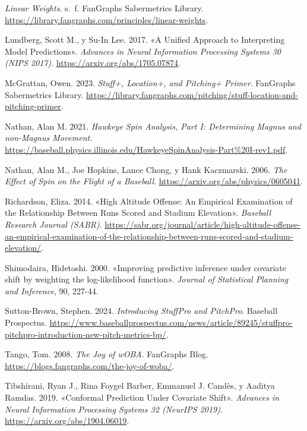 \documentclass[
  english,
  spanish,
  10pt,
  letterpaper,
]{article}
\newlength{\cslhangindent}
\newenvironment{CSLReferences}[2] %
 {\begin{list}{}{%
  \setlength{\itemindent}{0pt}
  \setlength{\leftmargin}{0pt}
  \setlength{\parsep}{0pt}
  \ifodd #1
   \setlength{\leftmargin}{\cslhangindent}
   \setlength{\itemindent}{-1\cslhangindent}
  \fi
  \setlength{\itemsep}{#2\baselineskip}}}
 {\end{list}}
\begin{document}
\begin{CSLReferences}{1}{0}
\emph{Linear Weights}. s.~f. FanGraphs Sabermetrics Library.
\url{https://library.fangraphs.com/principles/linear-weights}.

Lundberg, Scott M., y Su-In Lee. 2017. {«A Unified Approach to
Interpreting Model Predictions»}. \emph{Advances in Neural Information
Processing Systems 30 (NIPS 2017)}.
\url{https://arxiv.org/abs/1705.07874}.

McGrattan, Owen. 2023. \emph{Stuff+, Location+, and Pitching+ Primer}.
FanGraphs Sabermetrics Library.
\url{https://library.fangraphs.com/pitching/stuff-location-and-pitching-primer}.

Nathan, Alan M. 2021. \emph{Hawkeye Spin Analysis, Part I: Determining
Magnus and non-Magnus Movement}.
\url{https://baseball.physics.illinois.edu/HawkeyeSpinAnalysis-Part\%20I-rev1.pdf}.

Nathan, Alan M., Joe Hopkins, Lance Chong, y Hank Kaczmarski. 2006.
\emph{The Effect of Spin on the Flight of a Baseball}.
\url{https://arxiv.org/abs/physics/0605041}.

Richardson, Eliza. 2014. {«High Altitude Offense: An Empirical
Examination of the Relationship Between Runs Scored and Stadium
Elevation»}. \emph{Baseball Research Journal (SABR)}.
\url{https://sabr.org/journal/article/high-altitude-offense-an-empirical-examination-of-the-relationship-between-runs-scored-and-stadium-elevation/}.

Shimodaira, Hidetoshi. 2000. {«Improving predictive inference under
covariate shift by weighting the log-likelihood function»}.
\emph{Journal of Statistical Planning and Inference}, 90, 227-44.

Sutton-Brown, Stephen. 2024. \emph{Introducing StuffPro and PitchPro}.
Baseball Prospectus.
\url{https://www.baseballprospectus.com/news/article/89245/stuffpro-pitchpro-introduction-new-pitch-metrics-bp/}.

Tango, Tom. 2008. \emph{The Joy of wOBA}. FanGraphs Blog.
\url{https://blogs.fangraphs.com/the-joy-of-woba/}.

Tibshirani, Ryan J., Rina Foygel Barber, Emmanuel J. Candès, y Aaditya
Ramdas. 2019. {«Conformal Prediction Under Covariate Shift»}.
\emph{Advances in Neural Information Processing Systems 32 (NeurIPS
2019)}. \url{https://arxiv.org/abs/1904.06019}.

\end{CSLReferences}
\end{document}
